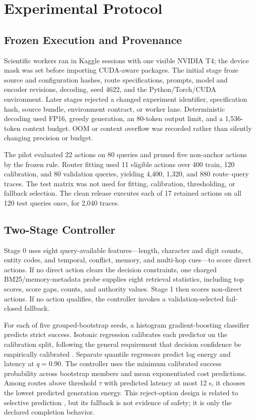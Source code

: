 \section{Experimental Protocol}
\label{sec:protocol}

\subsection{Frozen Execution and Provenance}

Scientific workers ran in Kaggle sessions with one visible NVIDIA T4; the device
mask was set before importing CUDA-aware packages. The initial stage froze source
and configuration hashes, route specifications, prompts, model and encoder
revisions, decoding, seed 4622, and the Python/Torch/CUDA environment. Later stages
rejected a changed experiment identifier, specification hash, source bundle,
environment contract, or worker lane. Deterministic decoding used FP16, greedy
generation, an 80-token output limit, and a 1,536-token context budget. OOM or
context overflow was recorded rather than silently changing precision or budget.

The pilot evaluated 22 actions on 80 queries and pruned five non-anchor actions by
the frozen rule. Router fitting used 11 eligible actions over 400 train, 120
calibration, and 80 validation queries, yielding 4,400, 1,320, and 880 route--query
traces. The test matrix was not used for fitting, calibration, thresholding, or
fallback selection. The clean release executes each of 17 retained actions on all
120 test queries once, for 2,040 traces.

\subsection{Two-Stage Controller}

Stage 0 uses eight query-available features---length, character and digit counts,
entity codes, and temporal, conflict, memory, and multi-hop cues---to score direct
actions. If no direct action clears the decision constraints, one charged
BM25/memory-metadata probe supplies eight retrieval statistics, including top
scores, score gaps, counts, and authority values. Stage 1 then scores non-direct
actions. If no action qualifies, the controller invokes a validation-selected
fail-closed fallback.

For each of five grouped-bootstrap seeds, a histogram gradient-boosting classifier
predicts strict success. Isotonic regression calibrates each predictor on the
calibration split, following the general requirement that decision confidence be
empirically calibrated \cite{GuoEtAl2017Calibration}. Separate quantile regressors
predict log energy and latency at $q=0.90$. The controller uses the minimum
calibrated success probability across bootstrap members and mean exponentiated cost
predictions. Among routes above threshold $\tau$ with predicted latency at most
12 s, it chooses the lowest predicted generation energy. This reject-option design
is related to selective prediction \cite{GeifmanElYaniv2019SelectiveNet}, but its
fallback is not evidence of safety; it is only the declared completion behavior.

